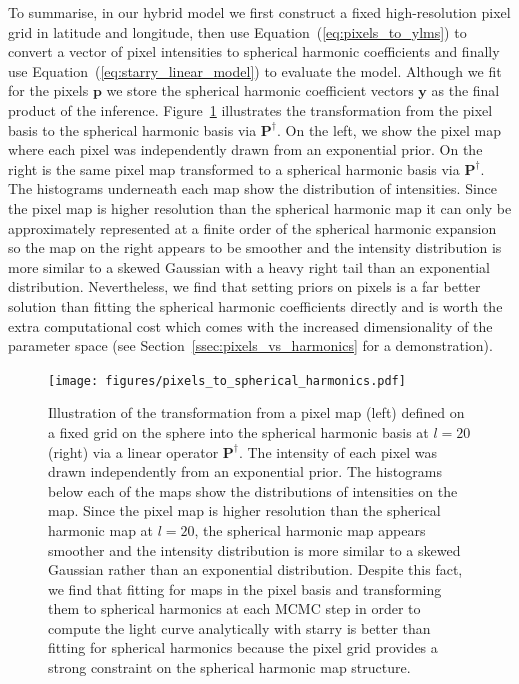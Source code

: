 \documentclass[12pt,dvipsnames]{report}
\begin{document}
To summarise, in our hybrid model we first construct a fixed high-resolution pixel grid in latitude and longitude, then use Equation~(\ref{eq:pixels_to_ylms}) to convert a vector of pixel intensities to spherical harmonic coefficients and finally use Equation~(\ref{eq:starry_linear_model}) to evaluate the model.
Although we fit for the pixels $\mathbf{p}$ we store the spherical harmonic coefficient vectors $\mathbf{y}$ as the final product of the inference. 
Figure~\ref{fig:pixels_to_harmonics} illustrates the transformation from the pixel basis to the spherical harmonic basis via $\mathbf{P}^\dagger$.
On the left, we show the pixel map where each pixel was independently drawn from an exponential prior. 
On the right is the same pixel map transformed to a spherical harmonic basis via $\mathbf{P}^\dagger$. 
The histograms underneath each map show the distribution of intensities.
Since the pixel map is higher resolution than the spherical harmonic map it can only be approximately represented at a finite order of the spherical harmonic expansion so the map on the right appears to be smoother and the intensity distribution is more similar to a skewed Gaussian with a heavy right tail than an exponential distribution.
Nevertheless, we find that setting priors on pixels is a far better solution than fitting the spherical harmonic coefficients directly and is worth the extra computational cost which comes with the increased dimensionality of the parameter space (see Section~\ref{ssec:pixels_vs_harmonics} for a demonstration).

\begin{figure}[t!]
    \begin{centering}
    \texttt{[image: figures/pixels\_to\_spherical\_harmonics.pdf]}
    \caption{
        Illustration of the transformation from a pixel map (left) defined on a fixed grid on the sphere into the spherical harmonic basis at $l=20$ (right) via a linear operator $\mathbf{P}^\dagger$.
        The intensity of each pixel was drawn independently from an exponential prior.
        The histograms below each of the maps show the distributions of intensities on the map. 
        Since the pixel map is higher resolution than the spherical harmonic map at $l=20$, the         spherical harmonic map appears smoother and the intensity distribution is more similar to a skewed Gaussian rather than an exponential distribution.
        Despite this fact, we find that fitting for maps in the pixel basis and transforming them to spherical harmonics at each MCMC step in order to compute the light curve analytically with \textsf{starry} is better than fitting for spherical harmonics because the pixel grid provides a strong constraint on the spherical harmonic map structure.
    }
  \label{fig:pixels_to_harmonics}
    \end{centering}
\end{figure}
\end{document}

